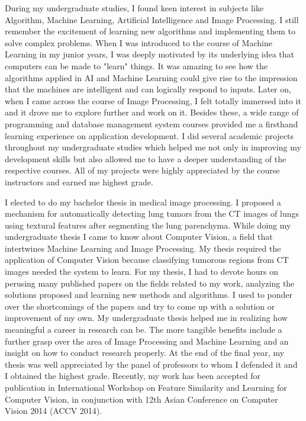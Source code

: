 \documentclass[12pt]{article}
\newcommand{\w}{2mm}
\begin{document}
During my undergraduate studies, I found keen interest in subjects like Algorithm, Machine Learning, Artificial Intelligence and Image Processing. I still remember the excitement of learning new algorithms and implementing them to solve complex problems. When I was introduced to the course of Machine Learning in my junior years, I was deeply motivated by its underlying idea that computers can be made to "learn" things. It was amazing to see how the algorithms applied in AI and Machine Learning could give rise to the impression that the machines are intelligent and can logically respond to inputs. Later on, when I came across the course of Image Processing, I felt totally immersed into it and it drove me to explore further and work on it. Besides these, a wide range of programming and database management system courses provided me a firsthand learning experience on application development. I did several academic projects throughout my undergraduate studies which helped me not only in improving my development skills but also allowed me to have a deeper understanding of the respective courses. All of my projects were highly appreciated by the course instructors and earned me highest grade.

\vspace{\w}

I elected to do my bachelor thesis in medical image processing. I proposed a mechanism for automatically detecting lung tumors from the CT images of lungs using textural features after segmenting the lung parenchyma. While doing my undergraduate thesis I came to know about Computer Vision, a field that intertwines Machine Learning and Image Processing. My thesis required the application of Computer Vision because classifying tumorous regions from CT images needed the system to learn. For my thesis, I had to devote hours on perusing many published papers on the fields related to my work, analyzing the solutions proposed and learning new methods and algorithms. I used to ponder over the shortcomings of the papers and try to come up with a solution or improvement of my own. My undergraduate thesis helped me in realizing how meaningful a career in research can be. The more tangible benefits include a further grasp over the area of Image Processing and Machine Learning and an insight on how to conduct research properly.  At the end of the final year, my thesis was well appreciated by the panel of professors to whom I defended it and I obtained the highest grade. Recently, my work has been accepted for publication in International Workshop on Feature Similarity and Learning for Computer Vision, in conjunction with 12th Asian Conference on Computer Vision 2014 (ACCV 2014).
\end{document}
